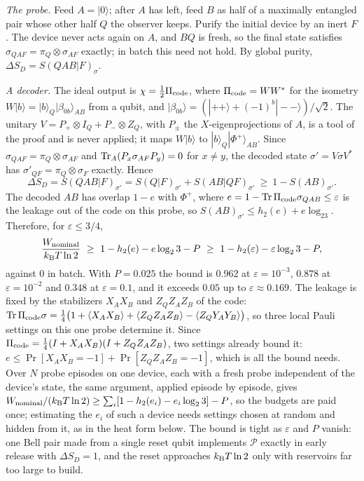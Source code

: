 \emph{The probe.} Feed $A=|0\rangle$; after $A$ has left, feed $B$ as half of a maximally entangled pair whose other half $Q$ the observer keeps. Purify the initial device by an inert $F$. The device never acts again on $A$, and $BQ$ is fresh, so the final state satisfies $\sigma_{QAF}=\pi_Q\otimes\sigma_{AF}$ exactly; in batch this need not hold. By global purity, $\Delta S_D=S(QAB|F)_\sigma$.

\emph{A decoder.} The ideal output is $\chi=\tfrac12\Pi_{\rm code}$, where $\Pi_{\rm code}=WW^*$ for the isometry $W|b\rangle=|b\rangle_Q|\beta_{0b}\rangle_{AB}$ from a qubit, and $|\beta_{0b}\rangle=(|{+}{+}\rangle+(-1)^b|{-}{-}\rangle)/\sqrt2$. The unitary $V=P_+\otimes I_Q+P_-\otimes Z_Q$, with $P_\pm$ the $X$-eigenprojections of $A$, is a tool of the proof and is never applied; it maps $W|b\rangle$ to $|b\rangle_Q|\Phi^+\rangle_{AB}$. Since $\sigma_{QAF}=\pi_Q\otimes\sigma_{AF}$ and $\operatorname{Tr}_A(P_x\sigma_{AF}P_y)=0$ for $x\ne y$, the decoded state $\sigma'=V\sigma V^*$ has $\sigma'_{QF}=\pi_Q\otimes\sigma_F$ exactly. Hence
\[
\Delta S_D=S(QAB|F)_{\sigma'}=S(Q|F)_{\sigma'}+S(AB|QF)_{\sigma'}\ \ge\ 1-S(AB)_{\sigma'}.
\]
The decoded $AB$ has overlap $1-e$ with $\Phi^+$, where $e=1-\operatorname{Tr}\Pi_{\rm code}\sigma_{QAB}\le\varepsilon$ is the leakage out of the code on this probe, so $S(AB)_{\sigma'}\le h_2(e)+e\log_23$. Therefore, for $\varepsilon\le3/4$,
\[
\frac{W_{\rm nominal}}{\kB T\ln2}\ \ge\ 1-h_2(e)-e\log_23-P\ \ge\ 1-h_2(\varepsilon)-\varepsilon\log_23-P,
\]
against $0$ in batch. With $P=0.025$ the bound is $0.962$ at $\varepsilon=10^{-3}$, $0.878$ at $\varepsilon=10^{-2}$ and $0.348$ at $\varepsilon=0.1$, and it exceeds $0.05$ up to $\varepsilon\approx0.169$. The leakage is fixed by the stabilizers $X_AX_B$ and $Z_QZ_AZ_B$ of the code: $\operatorname{Tr}\Pi_{\rm code}\sigma=\tfrac14\bigl(1+\langle X_AX_B\rangle+\langle Z_QZ_AZ_B\rangle-\langle Z_QY_AY_B\rangle\bigr)$, so three local Pauli settings on this one probe determine it. Since $\Pi_{\rm code}=\tfrac14(I+X_AX_B)(I+Z_QZ_AZ_B)$, two settings already bound it: $e\le\Pr[X_AX_B=-1]+\Pr[Z_QZ_AZ_B=-1]$, which is all the bound needs. Over $N$ probe episodes on one device, each with a fresh probe independent of the device's state, the same argument, applied episode by episode, gives $W_{\rm nominal}/(k_{\mathrm B} T\ln2)\ge\sum_i[1-h_2(e_i)-e_i\log_23]-P$, so the budgets are paid once; estimating the $e_i$ of such a device needs settings chosen at random and hidden from it, as in the heat form below. The bound is tight as $\varepsilon$ and $P$ vanish: one Bell pair made from a single reset qubit implements $\mathcal P$ exactly in early release with $\Delta S_D=1$, and the reset approaches $k_{\mathrm B} T\ln2$ only with reservoirs far too large to build.

